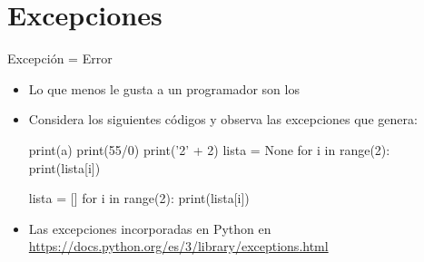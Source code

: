 \documentclass[10pt, envcountsect , spanish]{beamer}
\begin{document}
\section{Excepciones}

\begin{frame}[fragile]{Excepción = Error} \large
\small

\begin{itemize}\setlength{\itemsep}{0pt}
\item Lo que menos le gusta a un programador son los 

\item Considera los siguientes códigos y observa las excepciones que genera:

{\tiny
\begin{pyconsole}[][frame=single, fontsize=\tiny]
print(a)
print(55/0)
print('2' + 2)
lista = None
for i in range(2):
    print(lista[i])
    
lista = []
for i in range(2):
    print(lista[i])

\end{pyconsole}
}

\item Las excepciones incorporadas en Python en \url{https://docs.python.org/es/3/library/exceptions.html}
\end{itemize}
\end{frame}
\end{document}
